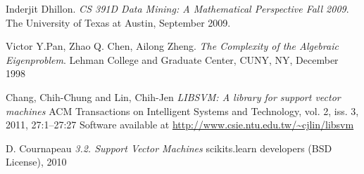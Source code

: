 \documentclass[10pt,twocolumn,letterpaper]{article}
\begin{document}
\begin{thebibliography}{9}
Inderjit Dhillon. 
\textit{CS 391D Data Mining: A Mathematical Perspective Fall 2009}. 
The University of Texas at Austin, September 2009.

Victor Y.Pan, Zhao Q. Chen, Ailong Zheng. 
\textit{The Complexity of the Algebraic Eigenproblem}. 
Lehman College and Graduate Center, CUNY, NY, December 1998

Chang, Chih-Chung and Lin, Chih-Jen
\textit{LIBSVM: A library for support vector machines}
ACM Transactions on Intelligent Systems and Technology, vol. 2, iss. 3, 2011, 27:1--27:27
Software available at \url{http://www.csie.ntu.edu.tw/~cjlin/libsvm}

D. Cournapeau
\textit{3.2. Support Vector Machines}
scikits.learn developers (BSD License), 2010

\end{thebibliography}
\end{document}
